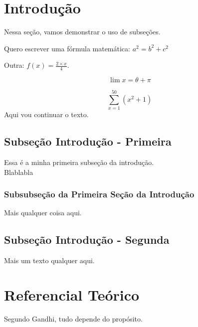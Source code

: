 \documentclass[12pt]{article}
\begin{document}
	
	\maketitle
	\section{Introdução}
	
	Nessa seção, vamos demonstrar o uso de subseções.
	
	Quero escrever uma fórmula matemática: $a^2 = b^2 + c^2$
	
	Outra: $f(x) = \frac{2 \times x}{4}$.
	
	\[ \lim x = \theta + \pi \]
	
	\[ \sum_{x=1}^{50} (x^2 + 1)\]
	Aqui vou continuar o texto.
	
	\subsection{Subseção Introdução - Primeira}
	
	Essa é a minha primeira {\color{red}subseção da introdução.} \\ Blablabla
	
	\subsubsection{Subsubseção da Primeira Seção da Introdução}
	
	Mais qualquer coisa aqui.
	
	\subsection{Subseção Introdução - Segunda}
	
	Mais um texto qualquer aqui.
	
	\section{Referencial Teórico}
	
	Segundo Gandhi, tudo depende do propósito.
	
\end{document}
